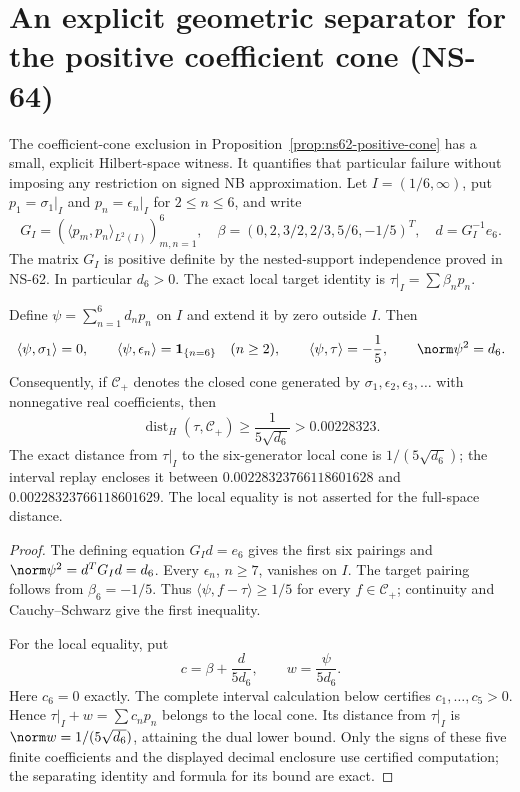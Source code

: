 \section{An explicit geometric separator for the positive coefficient cone (NS-64)}
\label{sec:ns64-cone-separator}

The coefficient-cone exclusion in Proposition~\ref{prop:ns62-positive-cone}
has a small, explicit Hilbert-space witness. It quantifies that particular
failure without imposing any restriction on signed NB approximation.
Let $I=(1/6,\infty)$, put $p_1=\sigma_1|_I$ and
$p_n=\epsilon_n|_I$ for $2\leq n\leq6$, and write
\[
 G_I=(\langle p_m,p_n\rangle_{L^2(I)})_{m,n=1}^6,\quad
 \beta=(0,2,3/2,2/3,5/6,-1/5)^T,\quad
 d=G_I^{-1}e_6.
\]
The matrix $G_I$ is positive definite by the nested-support independence
proved in NS-62. In particular $d_6>0$.
The exact local target identity is $\tau|_I=\sum\beta_np_n$.

\begin{proposition}
\label{prop:ns64-cone-distance}
Define $\psi=\sum_{n=1}^6d_np_n$ on $I$ and extend it by zero outside
$I$. Then
\[
 \langle\psi,\sigma_1\rangle=0,\qquad
 \langle\psi,\epsilon_n\rangle=\mathbf1_{\{n=6\}}\quad(n\geq2),
 \qquad \langle\psi,\tau\rangle=-\frac15,
 \qquad \norm\psi^2=d_6.
\]
Consequently, if $\mathcal C_+$ denotes the closed cone generated by
$\sigma_1,\epsilon_2,\epsilon_3,\ldots$ with nonnegative real
coefficients, then
\begin{equation}
 \operatorname{dist}_H(\tau,\mathcal C_+)
 \geq\frac1{5\sqrt{d_6}}>0.00228323.
 \label{eq:ns64-positive-gap}
\end{equation}
The exact distance from $\tau|_I$ to the six-generator local cone is
$1/(5\sqrt{d_6})$; the interval replay encloses it between
$0.00228323766118601628$ and $0.00228323766118601629$.
The local equality is not asserted for the full-space distance.
\end{proposition}
\begin{proof}
The defining equation $G_Id=e_6$ gives the first six pairings and
$\norm\psi^2=d^TG_Id=d_6$. Every $\epsilon_n$, $n\geq7$, vanishes
on $I$. The target pairing follows from $\beta_6=-1/5$.
Thus $\langle\psi,f-\tau\rangle\geq1/5$ for every $f\in\mathcal C_+$;
continuity and Cauchy--Schwarz give the first inequality.

For the local equality, put
\[
 c=\beta+\frac{d}{5d_6},\qquad w=\frac{\psi}{5d_6}.
\]
Here $c_6=0$ exactly. The complete interval calculation below certifies
$c_1,\ldots,c_5>0$. Hence $\tau|_I+w=\sum c_np_n$ belongs to the
local cone. Its distance from $\tau|_I$ is $\norm w=1/(5\sqrt{d_6})$,
attaining the dual lower bound. Only the signs of these five finite
coefficients and the displayed decimal enclosure use certified
computation; the separating identity and formula for its bound are exact.
\end{proof}

